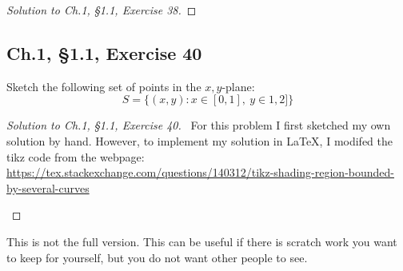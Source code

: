 \documentclass[12pt]{amsart}
\numberwithin{equation}{section}
\theoremstyle{definition}
\theoremstyle{remark}
\newif\ifnotes
\begin{document}
\begin{proof}[Solution to Ch.1, \S 1.1,  Exercise 38]

\end{proof}




\subsection*{Ch.1, \S 1.1,  Exercise 40} 
 Sketch the following set of points in the $x,y$-plane:
$$
S=\{(x,y): x\in [0,1], \ y\in 1,2]\}
$$



\begin{proof}[Solution to Ch.1, \S 1.1,  Exercise 40]
\ 
For this problem I first sketched my own solution by hand.  However, to implement my solution in \LaTeX, I  modifed the tikz code from the webpage: 
\\ 
\url{https://tex.stackexchange.com/questions/140312/tikz-shading-region-bounded-by-several-curves}
\begin{center}
\end{center}

\end{proof}





\ifnotes


\else
	This is not the full version.  This can be useful if there is scratch work you want to keep for yourself, but you do not want other people to see. 
\fi





\end{document}
